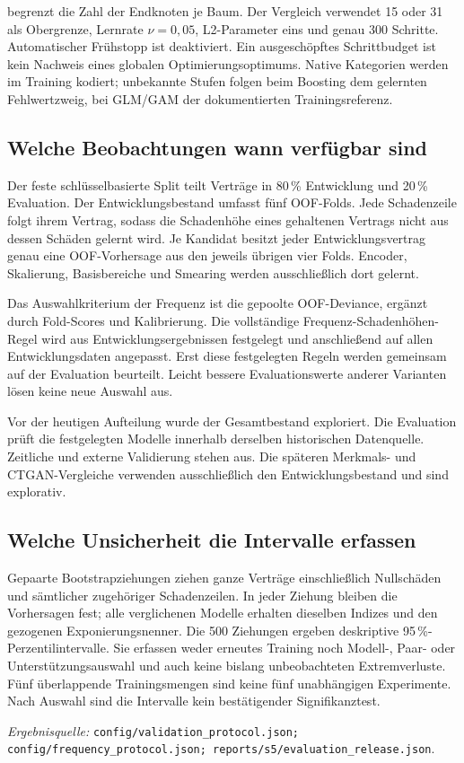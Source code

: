 \documentclass[11pt,a4paper]{article}
\newcommand{\code}[1]{\texttt{\detokenize{#1}}}
\newcommand{\evidence}[1]{\par{\footnotesize\textit{Ergebnisquelle:} \nolinkurl{#1}.}\par}
\begin{document}
\code{max_leaf_nodes} begrenzt die Zahl der Endknoten je Baum. Der Vergleich verwendet 15 oder 31 als Obergrenze, Lernrate $\nu=0{,}05$, L2-Parameter eins und genau 300 Schritte. Automatischer Frühstopp ist deaktiviert. Ein ausgeschöpftes Schrittbudget ist kein Nachweis eines globalen Optimierungsoptimums. Native Kategorien werden im Training kodiert; unbekannte Stufen folgen beim Boosting dem gelernten Fehlwertzweig, bei GLM/GAM der dokumentierten Trainingsreferenz.

\subsection*{Welche Beobachtungen wann verfügbar sind}
Der feste schlüsselbasierte Split teilt Verträge in 80\,\% Entwicklung und 20\,\% Evaluation. Der Entwicklungsbestand umfasst fünf OOF-Folds. Jede Schadenzeile folgt ihrem Vertrag, sodass die Schadenhöhe eines gehaltenen Vertrags nicht aus dessen Schäden gelernt wird. Je Kandidat besitzt jeder Entwicklungsvertrag genau eine OOF-Vorhersage aus den jeweils übrigen vier Folds. Encoder, Skalierung, Basisbereiche und Smearing werden ausschließlich dort gelernt.

Das Auswahlkriterium der Frequenz ist die gepoolte OOF-Deviance, ergänzt durch Fold-Scores und Kalibrierung. Die vollständige Frequenz-Schadenhöhen-Regel wird aus Entwicklungsergebnissen festgelegt und anschließend auf allen Entwicklungsdaten angepasst. Erst diese festgelegten Regeln werden gemeinsam auf der Evaluation beurteilt. Leicht bessere Evaluationswerte anderer Varianten lösen keine neue Auswahl aus.

Vor der heutigen Aufteilung wurde der Gesamtbestand exploriert. Die Evaluation prüft die festgelegten Modelle innerhalb derselben historischen Datenquelle. Zeitliche und externe Validierung stehen aus. Die späteren Merkmals- und CTGAN-Vergleiche verwenden ausschließlich den Entwicklungsbestand und sind explorativ.

\subsection*{Welche Unsicherheit die Intervalle erfassen}
Gepaarte Bootstrapziehungen ziehen ganze Verträge einschließlich Nullschäden und sämtlicher zugehöriger Schadenzeilen. In jeder Ziehung bleiben die Vorhersagen fest; alle verglichenen Modelle erhalten dieselben Indizes und den gezogenen Exponierungsnenner. Die 500 Ziehungen ergeben deskriptive 95\,\%-Perzentilintervalle. Sie erfassen weder erneutes Training noch Modell-, Paar- oder Unterstützungsauswahl und auch keine bislang unbeobachteten Extremverluste. Fünf überlappende Trainingsmengen sind keine fünf unabhängigen Experimente. Nach Auswahl sind die Intervalle kein bestätigender Signifikanztest.
\evidence{config/validation_protocol.json; config/frequency_protocol.json; reports/s5/evaluation_release.json}
\end{document}
